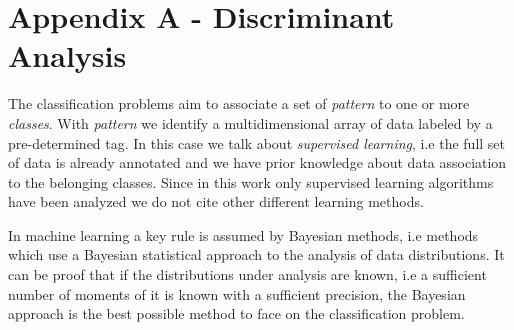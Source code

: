 \documentclass{standalone}
\begin{document}
\chapter*{Appendix A - Discriminant Analysis}

The classification problems aim to associate a set of \emph{pattern} to one or more \emph{classes}.
With \emph{pattern} we identify a multidimensional array of data labeled by a pre-determined tag.
In this case we talk about \emph{supervised learning}, i.e the full set of data is already annotated and we have prior knowledge about data association to the belonging classes.
Since in this work only supervised learning algorithms have been analyzed we do not cite other different learning methods.

In machine learning a key rule is assumed by Bayesian methods, i.e methods which use a Bayesian statistical approach to the analysis of data distributions.
It can be proof that if the distributions under analysis are known, i.e a sufficient number of moments of it is known with a sufficient precision, the Bayesian approach is the best possible method to face on the classification problem. %
\end{document}
